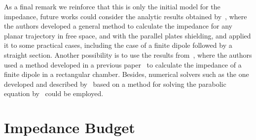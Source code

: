     As a final remark we reinforce that this is only the initial model for the impedance, future works could consider the analytic results obtained by~, where the authors developed a general method to calculate the impedance for any planar trajectory in free space, and with the parallel plates shielding, and applied it to some practical cases, including the case of a finite dipole followed by a straight section. Another possibility is to use the results from~, where the authors used a method developed in a previous paper~\cite{Stupakov2003} to calculate the impedance of a finite dipole in a rectangular chamber. Besides, numerical solvers such as the one developed and described by~ based on a method for solving the parabolic equation by~ could be employed.


\chapter{Impedance Budget}\label{cap:impedance_budget}

